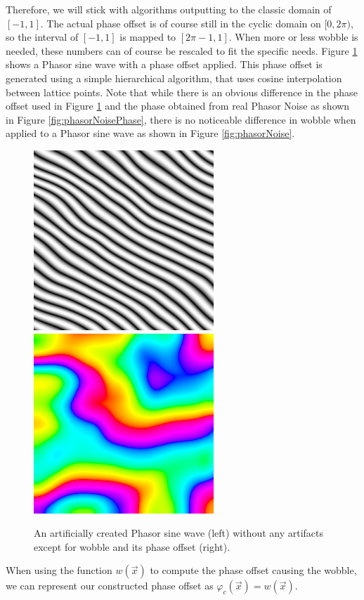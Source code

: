 \documentclass{utue} %
\begin{document}
Therefore, we will stick with algorithms outputting to the classic domain of $[-1,1]$. The actual phase offset is of course still in the cyclic domain on $[0,2\pi)$, so the interval of $[-1,1]$ is mapped to $[2\pi-1,1]$. When more or less wobble is needed, these numbers can of course be rescaled to fit the specific needs. Figure \ref{fig:wobble} shows a Phasor sine wave with a phase offset applied. This phase offset is generated using a simple hierarchical algorithm, that uses cosine interpolation between lattice points. Note that while there is an obvious difference in the phase offset used in Figure \ref{fig:wobble} and the phase obtained from real Phasor Noise as shown in Figure \ref{fig:phasorNoisePhase}, there is no noticeable difference in wobble when applied to a Phasor sine wave as shown in Figure \ref{fig:phasorNoise}.
\begin{figure}[h]
  \centering
  \includegraphics[width=0.45\linewidth]{images/wobble}
  \includegraphics[width=0.45\linewidth]{images/wobblePhase}
  \caption{An artificially created Phasor sine wave (left) without any artifacts except for wobble and its phase offset (right).}\label{fig:wobble}
\end{figure}
When using the function $w(\vec{x})$ to compute the phase offset causing the wobble, we can represent our constructed phase offset as $\varphi_c(\vec{x}) = w(\vec{x})$.
\end{document}
